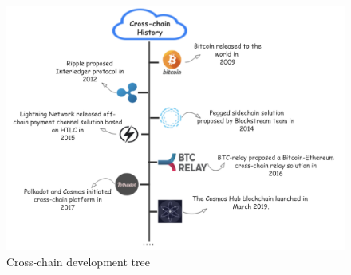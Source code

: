     \begin{figure}[H]
    \includegraphics[width=1\textwidth]{./figures/his.png}
    \centering
    \caption{Cross-chain development tree}%
    \centering
    \label{fig:his}
    \end{figure}
    
